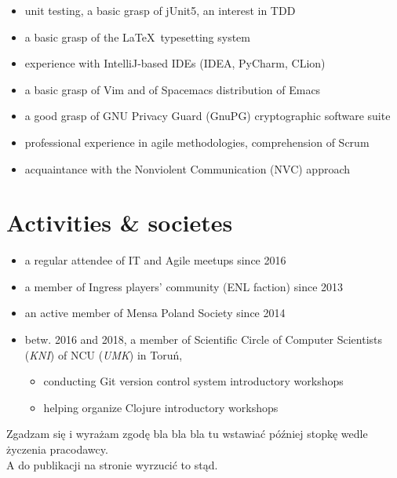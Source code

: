 \documentclass[a4paper]{res}
\begin{document}
\begin{resume}
\begin{itemize}
        \item unit testing, a basic grasp of jUnit5, an interest in TDD
        \vspace{-0.04in}
        \item a basic grasp of the \LaTeX~typesetting system
        \vspace{-0.04in}
        \item experience with IntelliJ-based IDEs (IDEA, PyCharm, CLion)
        \vspace{-0.04in}
        \item a basic grasp of Vim and of Spacemacs distribution of Emacs
        \vspace{-0.04in}
        \item a good grasp of GNU Privacy Guard (GnuPG) cryptographic software suite
        \item professional experience in agile methodologies, comprehension of Scrum
        \vspace{-0.04in}
        \item acquaintance with the Nonviolent Communication (NVC) approach
    \end{itemize}
    \vspace{-0.24in}
    \section{Activities \& societes}
        \vspace{0.1in}
    \begin{itemize}
        \item a regular attendee of IT and Agile meetups since 2016
        \vspace{-0.07in}
        \item a member of Ingress players' community (ENL faction) since 2013
        \vspace{-0.07in}
        \item an active member of Mensa Poland Society since 2014
        \vspace{-0.05in}
        \item \footnotesize betw. 2016 and 2018, a member of {Scientific Circle of Computer Scientists (\textsl{KNI})
        of NCU (\textsl{UMK}) in Toruń},
        \vspace{-0.2in}
        \begin{itemize}
        \vspace{-0.01in}
            \item conducting Git version control system introductory workshops
        \vspace{-0.05in}
            \item helping organize Clojure introductory workshops
        \end{itemize}
    \end{itemize}
\end{resume}
\vspace{-0.35in}
\begin{center}
    \noindent\makebox[\dimexpr\linewidth]{\rule{\dimexpr\paperwidth-3in}{0.4pt}}
    \footnotesize
    Zgadzam się i wyrażam zgodę bla bla bla tu wstawiać później stopkę wedle życzenia pracodawcy.\\
    A do publikacji na stronie wyrzucić to stąd.
\end{center}
\end{document}
